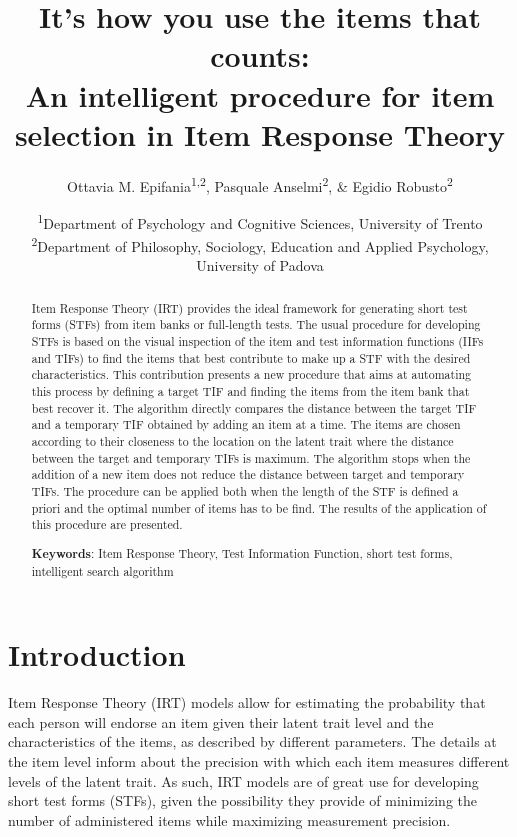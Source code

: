 \documentclass[12pt, a4paper, titilepage]{article}
\title{It's how you use the items that counts: \\ An intelligent procedure for item selection in Item Response Theory}
\author{Ottavia M. Epifania\textsuperscript{1,2}, Pasquale Anselmi\textsuperscript{2}, \& Egidio Robusto\textsuperscript{2}}
\date{\textsuperscript{1}Department of Psychology and Cognitive Sciences, University of Trento \newline \textsuperscript{2}Department of Philosophy, Sociology, Education and Applied Psychology, University of Padova}
\begin{document}
\onehalfspacing

\maketitle

\begin{abstract}
Item Response Theory (IRT) provides the ideal framework for generating short test forms (STFs) from item banks or full-length tests. The usual procedure for developing STFs is based on the visual inspection of the item and test information functions (IIFs and TIFs) to find the items that best contribute to make up a STF with the desired characteristics. This contribution presents a new procedure that aims at automating this process by defining a target TIF and finding the items from the item bank that best recover it. The algorithm directly compares the distance between the target TIF and a temporary TIF obtained by adding an item at a time. The items are chosen according to their closeness to the location on the latent trait where the distance between the target and temporary TIFs is maximum. The algorithm stops when the addition of a new item does not reduce the distance between target and temporary TIFs. The procedure can be applied both when the length of the STF is defined a priori and the optimal number of items has to be find. The results of the application of this procedure are presented. 

\noindent \textbf{Keywords}:  Item Response Theory, Test Information Function, short test forms, intelligent search algorithm 
\end{abstract}

\newpage

\section*{Introduction}

Item Response Theory (IRT) models allow for estimating the probability that each person will endorse an item given their latent trait level and the characteristics of the items, as described by different parameters. The details at the item level inform about the precision with which each item measures different levels of the latent trait. As such, IRT models are of great use for developing short test forms (STFs), given the possibility they provide of minimizing the number of administered items while maximizing measurement precision.
\end{document}
